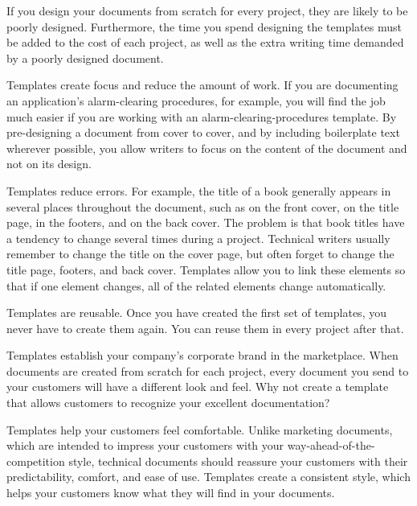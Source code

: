 \documentclass[12pt]{article}
\begin{document}
If you design your documents from scratch for every project, they are likely to be poorly designed. Furthermore, the time you spend designing the templates must be added to the cost of each project, as well as the extra writing time demanded by a poorly designed document.

Templates create focus and reduce the amount of work. If you are documenting an application's alarm-clearing procedures, for example, you will find the job much easier if you are working with an alarm-clearing-procedures template. By pre-designing a document from cover to cover, and by including boilerplate text wherever possible, you allow writers to focus on the content of the document and not on its design.

Templates reduce errors. For example, the title of a book generally appears in several places throughout the document, such as on the front cover, on the title page, in the footers, and on the back cover. The problem is that book titles have a tendency to change several times during a project. Technical writers usually remember to change the title on the cover page, but often forget to change the title page, footers, and back cover. Templates allow you to link these elements so that if one element changes, all of the related elements change automatically.

Templates are reusable. Once you have created the first set of templates, you never have to create them again. You can reuse them in every project after that.

Templates establish your company's corporate brand in the marketplace. When documents are created from scratch for each project, every document you send to your customers will have a different look and feel. Why not create a template that allows customers to recognize your excellent documentation?

Templates help your customers feel comfortable. Unlike marketing documents, which are intended to impress your customers with your way-ahead-of-the-competition style, technical documents should reassure your customers with their predictability, comfort, and ease of use. Templates create a consistent style, which helps your customers know what they will find in your documents.
\end{document}
